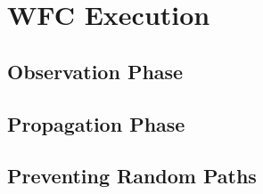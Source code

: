 \documentclass[../../main.tex]{subfiles}
\begin{document}
\section{WFC Execution}

\subsection{Observation Phase}
\subsection{Propagation Phase}
\subsection{Preventing Random Paths}
\end{document}
